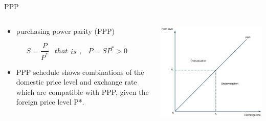 \documentclass[10pt,hyperref={CJKbookmarks=true},xcolor=dvipsnames,aspectratio=169]{beamer}
\begin{document}
\begin{frame}{PPP}




\begin{columns}[onlytextwidth]
\begin{column}{0.4\textwidth}
\begin{itemize}
\item purchasing power parity (PPP)
\end{itemize}

\[
S=\frac{P}{P^{*}}\begin{array}{c}
\end{array}that\begin{array}{c}
is\end{array},\begin{array}{c}
\end{array}P=SP^{*}>0
\]

\begin{itemize}
\item PPP schedule shows combinations of the domestic price level and exchange
rate which are compatible with PPP, given the foreign price level
P{*}. 
\end{itemize}

\end{column}
\begin{column}{0.6\textwidth}
\includegraphics[width=0.9\columnwidth]{fig/boptheory/lec08-16}
\end{column}
\end{columns}

\end{frame}
\end{document}
